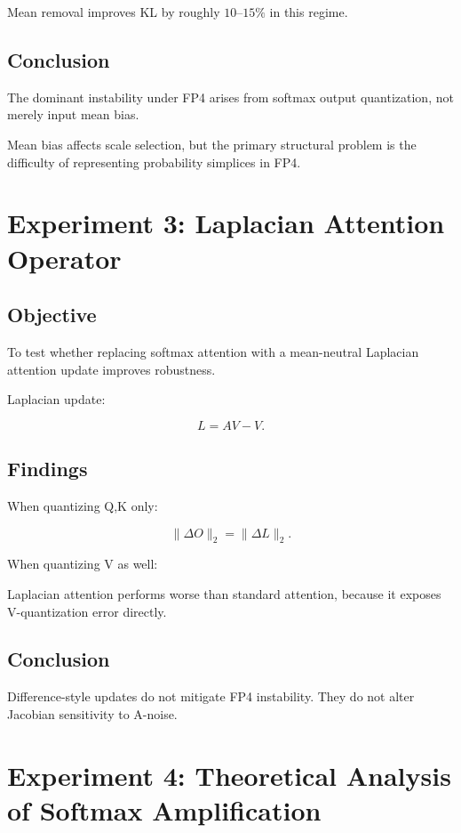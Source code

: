 Mean removal improves KL by roughly $10$--$15\%$ in this regime.

\subsection{Conclusion}

The dominant instability under FP4 arises from
softmax output quantization, not merely input mean bias.

Mean bias affects scale selection,
but the primary structural problem is the difficulty of
representing probability simplices in FP4.

\section{Experiment 3: Laplacian Attention Operator}

\subsection{Objective}

To test whether replacing softmax attention with
a mean-neutral Laplacian attention update improves robustness.

Laplacian update:

\[
L = AV - V.
\]

\subsection{Findings}

When quantizing Q,K only:

\[
\|\Delta O\|_2 = \|\Delta L\|_2.
\]

When quantizing V as well:

Laplacian attention performs worse than standard attention,
because it exposes V-quantization error directly.

\subsection{Conclusion}

Difference-style updates do not mitigate FP4 instability.
They do not alter Jacobian sensitivity to A-noise.

\section{Experiment 4: Theoretical Analysis of Softmax Amplification}

